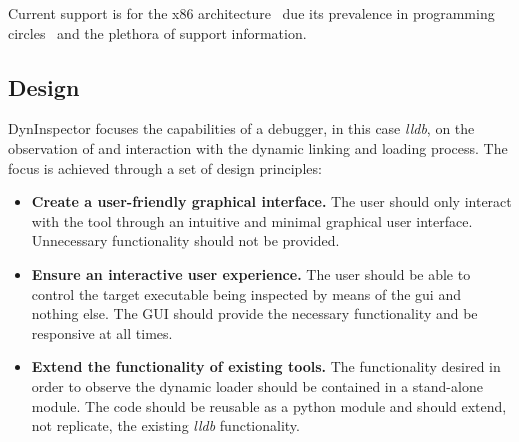 Current support is for the x86 architecture~\cite{x86-fundamentals} due its prevalence in programming circles~\cite{Blem13adetailed} and the plethora of support information.

\subsection{Design}

DynInspector focuses the capabilities of a debugger, in this case \textit{lldb}, on the observation of and interaction with the dynamic linking and loading process. The focus is achieved through a set of design principles:

\begin{itemize}
\item \textbf{Create a user-friendly graphical interface.} The user should only interact with the tool through an intuitive and minimal graphical user interface. Unnecessary functionality should not be provided.
\item \textbf{Ensure an interactive user experience.} The user should be able to control the target executable being inspected by means of the gui and nothing else. The GUI should provide the necessary functionality and be responsive at all times.
\item \textbf{Extend the functionality of existing tools.} The functionality desired in order to observe the dynamic loader should be contained in a stand-alone module. The code should be reusable as a python module and should extend, not replicate, the existing \textit{lldb} functionality.
\end{itemize}
